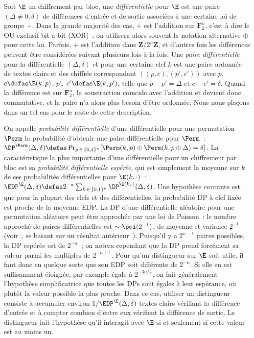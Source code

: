 Soit $\E$ un chiffrement par bloc, une \emph{différentielle} pour $\E$ est une paire
$(\Delta \neq 0,\delta)$ de différences d'entrée et de sortie associées à une certaine loi de groupe
$+$.
Dans la grande majorité des cas, $+$ est l'addition sur $\mathbf{F}_2^n$,
c'est à dire le OU exclusif bit à bit (XOR)~; on utilisera alors souvent la notation alternative $\oplus$ pour cette loi.
Parfois, $+$ est l'addition dans $\mathbf{Z}/2^n\mathbf{Z}$, et d'autres fois les différences peuvent être considérées suivant plusieurs lois à la fois.
Une \emph{paire différentielle} pour la différentielle $(\Delta,\delta)$ et pour une certaine clef $k$
est une paire ordonnée de textes clairs et des chiffrés correspondant $((p,c), (p',c'))$ avec
$p$, $c \defas \E(k,p)$, $p'$, $c' \defas \E(k,p')$, telle que $p - p' = \Delta$ et $c - c' = \delta$. Quand la différence est sur $\mathbf{F}_2^n$,
la soustraction coïncide avec l'addition et devient donc commutative, et la paire n'a alors plus besoin d'être ordonnée.
Nous nous plaçons dans un tel cas pour le reste de cette description.

On appelle \emph{probabilité différentielle} d'une différentielle pour une permutation $\Perm$ la probabilité d'obtenir une
paire différentielle pour $\Perm$~:
$\DP^{\Perm}(\Delta,\delta) \defas \Pr_{p\,\in\,\{0,1\}^n}[\Perm(k,p) \oplus \Perm(k,p \oplus \Delta) = \delta]$.
La caractéristique la plus importante d'une différentielle pour un chiffrement par bloc est sa \emph{probabilité différentielle espérée},
qui est simplement la moyenne sur $k$ de ses probabilités différentielles pour $\E(k,\cdot)$~:
$\EDP^{\E}(\Delta,\delta) \defas 2^{-\kappa}\sum_{k\,\in\,\{0,1\}^\kappa} \DP^{\E(k,\cdot)}(\Delta,\delta)$.
Une hypothèse courante est que pour la plupart des clefs et des différentielles, la probabilité DP à clef fixée
est proche de la moyenne EDP.
La DP d'une différentielle aléatoire pour une permutation aléatoire peut être approchée par une loi de Poisson~:
le nombre approché de paires différentielles est
$\sim \poi(2^{-1})$, de moyenne et variance $2^{-1}$
(voir~\cite{DBLP:journals/jmc/DaemenR07}, se basant sur un résultat antérieur~\cite{DBLP:journals/joc/OConnor95}).
Puisqu'il y a
$2^{n-1}$ paires possibles, la DP espérée est de $2^{-n}$~; on notera cependant que la DP prend forcément sa valeur parmi les multiples de $2^{-n+1}$.
Pour qu'un distingueur sur $\E$ soit utile, il faut donc en quelque sorte que son EDP soit différente de $2^{-n}$. Si elle en est suffisamment éloignée,
par exemple égale à $2^{-3n/4}$, on fait généralement l'hypothèse simplificatrice que toutes les DPs sont égales à leur espérance, ou plutôt la valeur
possible la plus proche.
Dans ce cas,
utiliser un distingueur consiste à accumuler environ
$1/\EDP^{\E}(\Delta,\delta)$ textes clairs vérifiant la différence d'entrée et à compter combien d'entre eux vérifient la différence de sortie.
Le distingueur fait l'hypothèse qu'il
interagit avec $\E$ si et seulement si cette valeur est au moins un.

